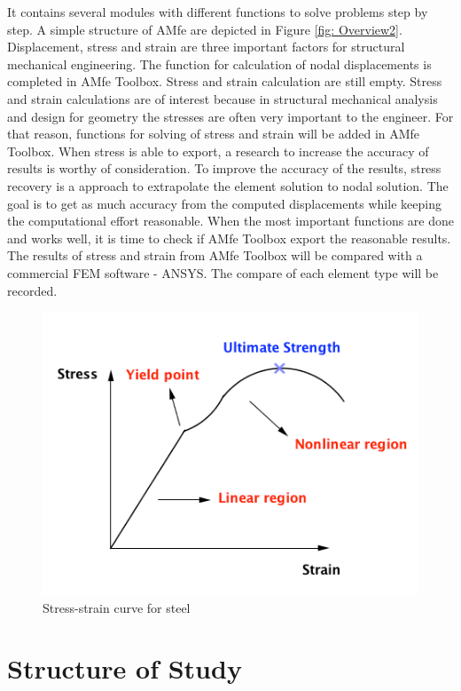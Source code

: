 It contains several modules with different functions to solve problems step by step. A simple structure of AMfe are depicted in Figure \ref{fig: Overview2}. Displacement, stress and strain are three important factors for structural mechanical engineering. The function for calculation of nodal displacements is completed in AMfe Toolbox. Stress and strain calculation are still empty. Stress and strain calculations are of interest because in structural mechanical analysis and design for geometry the stresses are often very important to the engineer. For that reason, functions for solving of stress and strain will be added in AMfe Toolbox. When stress is able to export, a research to increase the accuracy of results is worthy of consideration. To improve the accuracy of the results, stress recovery is a approach to extrapolate the element solution to nodal solution. The goal is to get as much accuracy from the computed displacements while keeping the computational effort reasonable. When the most important functions are done and works well, it is time to check if AMfe Toolbox export the reasonable results. The results of stress and strain from AMfe Toolbox will be compared with a commercial FEM software - ANSYS. The compare of each element type will be recorded. 

\begin{figure}
	\begin{center}
		\includegraphics[width=12cm,clip]{nonlinear.pdf}			
		\caption{Stress-strain curve for steel} \label{fig: nonlinear}
	\end{center}
\end{figure}

\section{Structure of Study}

